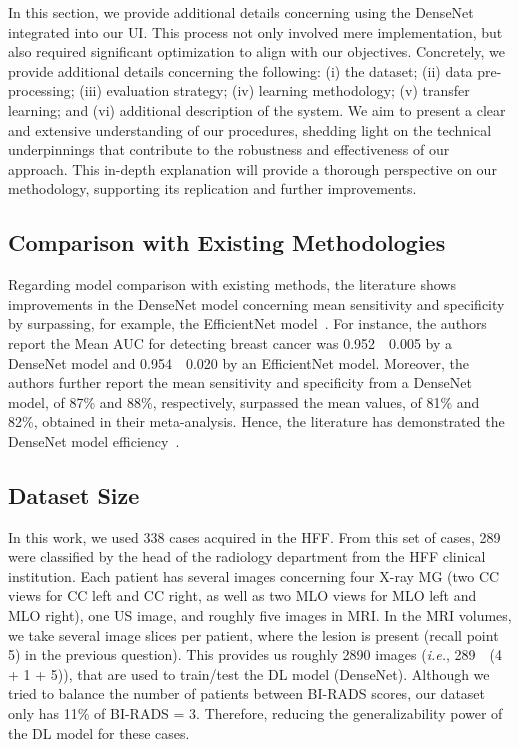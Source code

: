 In this section, we provide additional details concerning using the DenseNet integrated into our \ac{UI}.
This process not only involved mere implementation, but also required significant optimization to align with our objectives.
Concretely, we provide additional details concerning the following:
(i) the dataset;
(ii) data pre-processing;
(iii) evaluation strategy;
(iv) learning methodology;
(v) transfer learning; and
(vi) additional description of the system.
We aim to present a clear and extensive understanding of our procedures, shedding light on the technical underpinnings that contribute to the robustness and effectiveness of our approach.
This in-depth explanation will provide a thorough perspective on our methodology, supporting its replication and further improvements.

\subsection{Comparison with Existing Methodologies}
\label{sec:app004003001}

Regarding model comparison with existing methods, the literature shows improvements in the DenseNet model concerning mean sensitivity and specificity by surpassing, for example, the EfficientNet model~\cite{jpm10040211}.
For instance, the authors report the Mean \ac{AUC} for detecting breast cancer was 0.952~\textpm~0.005 by a DenseNet model and 0.954~\textpm~0.020 by an EfficientNet model.
Moreover, the authors further report the mean sensitivity and specificity from a DenseNet model, of 87\% and 88\%, respectively, surpassed the mean values, of 81\% and 82\%, obtained in their meta-analysis.
Hence, the literature has demonstrated the DenseNet model efficiency~\cite{8633197, Hai2019}.

\subsection{Dataset Size}
\label{sec:app004003002}

In this work, we used 338 cases acquired in the \acf{HFF}.
From this set of cases, 289 were classified by the head of the radiology department from the \ac{HFF} clinical institution.
Each patient has several images concerning four  X-ray \acs{MG} (two \acs{CC} views for \acs{CC} left and \acs{CC} right, as well as two \acs{MLO} views for \acs{MLO} left and \acs{MLO} right), one \acs{US} image, and roughly five images in \acs{MRI}.
In the \ac{MRI} volumes, we take several image slices per patient, where the lesion is present (recall point 5) in the previous question).
This provides us roughly 2890 images ({\it i.e.}, 289~\texttimes~(4 + 1 + 5)), that are used to train/test the \ac{DL} model (DenseNet).
Although we tried to balance the number of patients between \acs{BI-RADS} scores, our dataset only has 11\% of \acs{BI-RADS} = 3.
Therefore, reducing the generalizability power of the \ac{DL} model for these cases.

